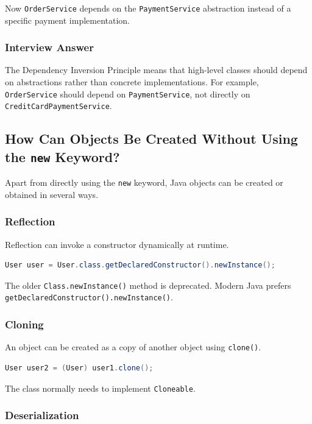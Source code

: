 \documentclass[12pt,a4paper]{article}
\begin{document}
Now \texttt{OrderService} depends on the
\texttt{PaymentService} abstraction instead of a specific payment
implementation.

\subsubsection*{Interview Answer}

The Dependency Inversion Principle means that high-level classes should
depend on abstractions rather than concrete implementations. For example,
\texttt{OrderService} should depend on \texttt{PaymentService}, not directly
on \texttt{CreditCardPaymentService}.

\subsection{How Can Objects Be Created Without Using the \texttt{new} Keyword?}

Apart from directly using the \texttt{new} keyword, Java objects can be
created or obtained in several ways.

\subsubsection*{Reflection}

Reflection can invoke a constructor dynamically at runtime.

\begin{lstlisting}[language=Java]
User user = User.class.getDeclaredConstructor().newInstance();
\end{lstlisting}

The older \texttt{Class.newInstance()} method is deprecated. Modern Java
prefers \texttt{getDeclaredConstructor().newInstance()}.

\subsubsection*{Cloning}

An object can be created as a copy of another object using
\texttt{clone()}.

\begin{lstlisting}[language=Java]
User user2 = (User) user1.clone();
\end{lstlisting}

The class normally needs to implement \texttt{Cloneable}.

\subsubsection*{Deserialization}
\end{document}
